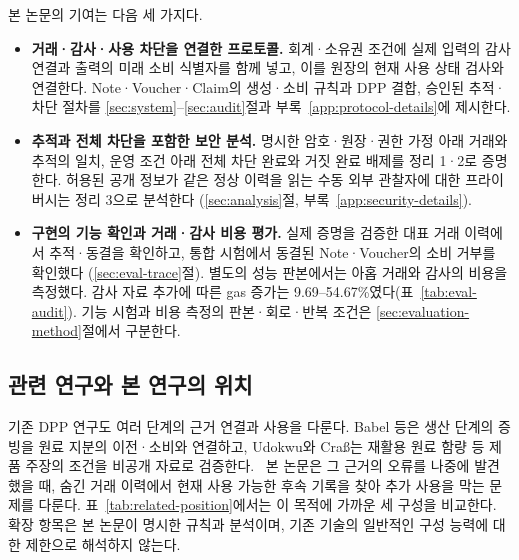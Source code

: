 본 논문의 기여는 다음 세 가지다.
\begin{itemize}
\item \textbf{거래·감사·사용 차단을 연결한 프로토콜.}
회계·소유권 조건에 실제 입력의 감사 연결과 출력의 미래 소비
식별자를 함께 넣고, 이를 원장의 현재 사용 상태 검사와 연결한다.
Note·Voucher·Claim의 생성·소비 규칙과 DPP 결합,
승인된 추적·차단 절차를 \ref{sec:system}--\ref{sec:audit}절과
부록~\ref{app:protocol-details}에 제시한다.
\item \textbf{추적과 전체 차단을 포함한 보안 분석.}
명시한 암호·원장·권한 가정 아래 거래와 추적의 일치,
운영 조건 아래 전체 차단 완료와 거짓 완료 배제를 정리 1·2로
증명한다. 허용된 공개 정보가 같은 정상 이력을 읽는 수동 외부
관찰자에 대한 프라이버시는 정리 3으로 분석한다
(\ref{sec:analysis}절, 부록~\ref{app:security-details}).
\item \textbf{구현의 기능 확인과 거래·감사 비용 평가.}
실제 증명을 검증한 대표 거래 이력에서 추적·동결을 확인하고,
통합 시험에서 동결된 Note·Voucher의 소비 거부를 확인했다
(\ref{sec:eval-trace}절). 별도의 성능 판본에서는 아홉 거래와
감사의 비용을 측정했다. 감사 자료 추가에 따른 gas 증가는
9.69--54.67\%였다(표~\ref{tab:eval-audit}).
기능 시험과 비용 측정의 판본·회로·반복 조건은
\ref{sec:evaluation-method}절에서 구분한다.~\cite{
zkdpp-m1hf-execution-2026,zkdpp-evaluation-data-2026}
\end{itemize}

\subsection{관련 연구와 본 연구의 위치}

기존 DPP 연구도 여러 단계의 근거 연결과 사용을 다룬다.
Babel 등은 생산 단계의 증빙을 원료 지분의 이전·소비와 연결하고,
Udokwu와 Craß는 재활용 원료 함량 등 제품 주장의 조건을 비공개
자료로 검증한다.~\cite{babel-hicss-2025,udokwu-crass-2026}
본 논문은 그 근거의 오류를 나중에 발견했을 때, 숨긴 거래 이력에서
현재 사용 가능한 후속 기록을 찾아 추가 사용을 막는 문제를 다룬다.
표~\ref{tab:related-position}에서는 이 목적에 가까운 세 구성을 비교한다.
확장 항목은 본 논문이 명시한 규칙과 분석이며, 기존 기술의 일반적인
구성 능력에 대한 제한으로 해석하지 않는다.

